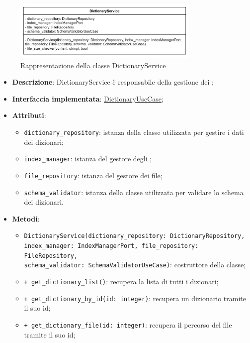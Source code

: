  \label{DictionaryService}
\begin{figure}[H]
    \centering
    \includegraphics[width=0.8\textwidth]{assets/Backend/dictionary_service.png}
    \caption{Rappresentazione della classe DictionaryService}
  \end{figure}
\begin{itemize}
    \item \textbf{Descrizione}: DictionaryService è responsabile della gestione dei ;
    \item \textbf{Interfaccia implementata}: \hyperref[DictionaryUseCase]{DictionaryUseCase};
    \item \textbf{Attributi}:
    \begin{itemize}
        \item \texttt{dictionary\_repository}: istanza della classe utilizzata per gestire i dati dei dizionari;
        \item \texttt{index\_manager}: istanza del gestore degli ;
        \item \texttt{file\_repository}: istanza del gestore dei file;
        \item \texttt{schema\_validator}: istanza della classe utilizzata per validare lo schema dei dizionari.
    \end{itemize}
    \item \textbf{Metodi}:
    \begin{itemize}
        \item \texttt{DictionaryService(dictionary\_repository: DictionaryRepository,\\ index\_manager: IndexManagerPort, file\_repository: FileRepository,\\ schema\_validator: SchemaValidatorUseCase)}: costruttore della classe;
        \item \texttt{+ get\_dictionary\_list()}: recupera la lista di tutti i dizionari;
        \item \texttt{+ get\_dictionary\_by\_id(id: integer)}: recupera un dizionario tramite il suo id;
        \item \texttt{+ get\_dictionary\_file(id: integer)}: recupera il percorso del file tramite il suo id;

\end{itemize}
\end{itemize}
